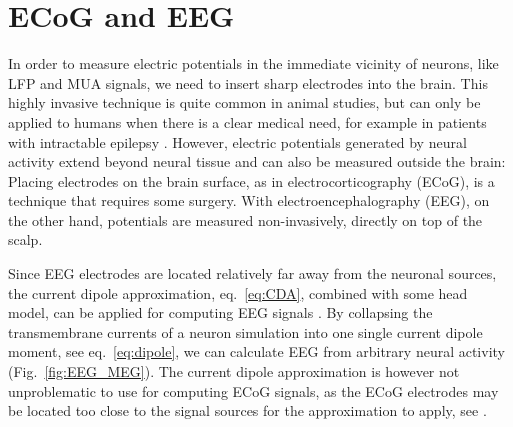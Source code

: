 \documentclass[preprint,11pt,authoryear]{elsarticle}
\newcommand{\hlj}[2][OliveGreen]{ {\sethlcolor{#1} \hl{#2}} }
\newcommand{\hlp}[2][Purple]{ {\sethlcolor{#1} \hl{#2}} }
\newcommand{\tvnnote}[1]{\color{white}{\hlj{TVN: #1 }}\color{black}}
\newcommand{\snnote}[1]{\color{white}{\hlp{SN: #1 }}\color{black}}
\newcommand{\slntxt}[1]{{\color{RoyalPurple}#1}}
\begin{document}
\section{ECoG and EEG}
\label{sec:EEG}
In order to measure electric potentials in the immediate vicinity of neurons, like LFP and MUA signals,
we need to insert sharp electrodes into the brain. This highly invasive technique is quite common in animal studies, but can only be applied to humans when there is a clear medical need, for example in patients with intractable epilepsy \citep{Zangiabadi2019}. However, electric potentials generated by neural activity extend beyond neural tissue and can also be measured outside the brain:
Placing electrodes on the brain surface, as in electrocorticography (ECoG), is a technique that requires some surgery. With electroencephalography (EEG), on the other hand, potentials are measured non-invasively, directly on top of the scalp.




Since EEG electrodes are located relatively far away from the neuronal sources, the current dipole approximation, eq.~\eqref{eq:CDA}, combined with some head model, can be applied for computing EEG signals \citep{Nunez2006,Ilmoniemi2019}. By collapsing the transmembrane currents of a neuron simulation into one single current dipole moment, see eq.~\eqref{eq:dipole}, we can calculate EEG from arbitrary neural activity (Fig.~\ref{fig:EEG_MEG}).
The current dipole approximation is however not unproblematic to use for computing ECoG signals, as the ECoG electrodes may be located too close to the 
signal sources for the approximation to apply, see \cite{Hagen2018}.
\end{document}

